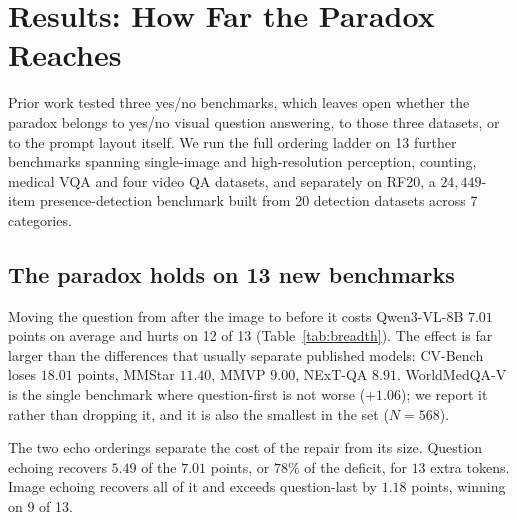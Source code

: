 \section{Results: How Far the Paradox Reaches}
\label{sec:results}
\label{sec:generality}

Prior work tested three yes/no benchmarks, which leaves open whether the paradox
belongs to yes/no visual question answering, to those three datasets, or to the
prompt layout itself. We run the full ordering ladder on 13 further benchmarks
spanning single-image and high-resolution perception, counting, medical VQA and
four video QA datasets, and separately on RF20, a $24{,}449$-item
presence-detection benchmark built from 20 detection datasets across 7
categories.

\subsection{The paradox holds on 13 new benchmarks}

Moving the question from after the image to before it costs Qwen3-VL-8B $7.01$
points on average and hurts on 12 of 13 (Table~\ref{tab:breadth}). The effect is
far larger than the differences that usually separate published models:
CV-Bench loses $18.01$ points, MMStar $11.40$, MMVP $9.00$, NExT-QA $8.91$.
WorldMedQA-V is the single benchmark where question-first is not worse
($+1.06$); we report it rather than dropping it, and it is also the smallest in
the set ($N = 568$).

The two echo orderings separate the cost of the repair from its size. Question
echoing recovers $5.49$ of the $7.01$ points, or $78\%$ of the deficit, for $13$
extra tokens. Image echoing recovers all of it and exceeds question-last by
$1.18$ points, winning on 9 of 13.

